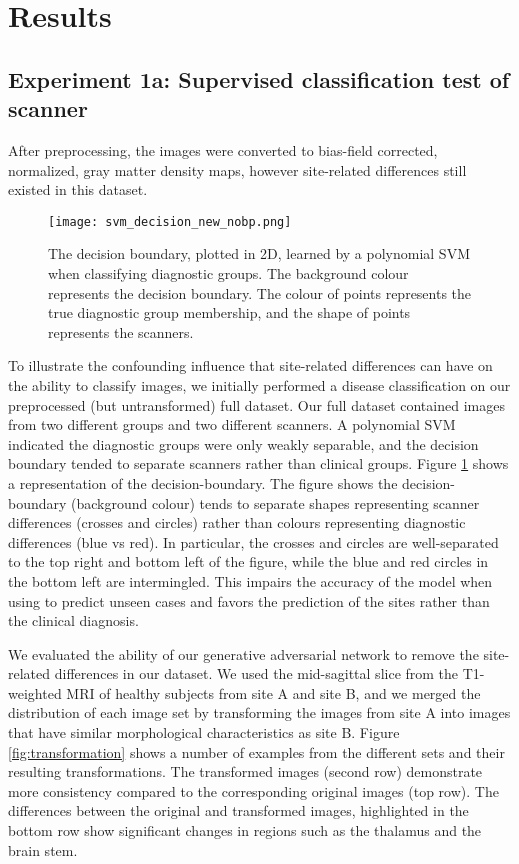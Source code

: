 \section{Results}
\subsection{Experiment 1a: Supervised classification test of scanner} \label{supervised_test}
After preprocessing, the images were converted to bias-field corrected, normalized, gray matter density maps, however site-related differences still existed in this dataset.

\begin{figure}[!ht]
\begin{center}
 \texttt{[image: svm\_decision\_new\_nobp.png]}
    \end{center}
  \caption{The decision boundary, plotted in 2D, learned by a polynomial SVM when classifying diagnostic groups. The background colour represents the decision boundary. The colour of points represents the true diagnostic group membership, and the shape of points represents the scanners.}
  \label{fig:svm_decision}
\end{figure}

To illustrate the confounding influence that site-related differences can have on the ability to classify images, we initially performed a disease classification on our preprocessed (but untransformed) full dataset. Our full dataset contained images from two different groups and two different scanners. A polynomial SVM indicated the diagnostic groups were only weakly separable, and the decision boundary tended to separate scanners rather than clinical groups. Figure \ref{fig:svm_decision} shows a representation of the decision-boundary. The figure shows the decision-boundary (background colour) tends to separate shapes representing scanner differences (crosses and circles) rather than colours representing diagnostic differences (blue vs red). In particular, the crosses and circles are well-separated to the top right and bottom left of the figure, while the blue and red circles in the bottom left are intermingled. This impairs the accuracy of the model when using to predict unseen cases and favors the prediction of the sites rather than the clinical diagnosis.

We evaluated the ability of our generative adversarial network to remove the site-related differences in our dataset. We used the mid-sagittal slice from the T1-weighted MRI of healthy subjects from site A and site B, and we merged the distribution of each image set by transforming the images from site A into images that have similar morphological characteristics as site B.
Figure \ref{fig:transformation} shows a number of examples from the different sets and their resulting transformations. The transformed images (second row) demonstrate more consistency compared to the corresponding original images (top row). The differences between the original and transformed images, highlighted in the bottom row show significant changes in regions such as the thalamus and the brain stem.

